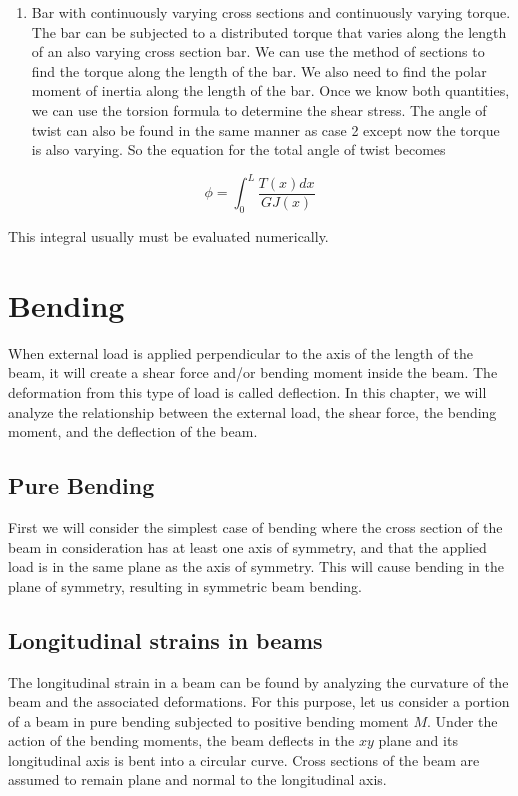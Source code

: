 \documentclass[a4paper,openany,12pt]{book}
\begin{document}
\begin{enumerate}
\item Bar with continuously varying cross sections and continuously varying
torque. The bar can be subjected to a distributed torque that varies
along the length of an also varying cross section bar. We can use the
method of sections to find the torque along the length of the bar. We
also need to find the polar moment of inertia along the length of the
bar. Once we know both quantities, we can use the torsion formula to
determine the shear stress. The angle of twist can also be found in
the same manner as case 2 except now the torque is also varying. So
the equation for the total angle of twist becomes
\end{enumerate}


$$\phi  = \int_0^L \frac{T(x)dx}{GJ(x)}$$

This integral usually must be evaluated numerically.

\section{Bending}
\label{section: bending}
When external load is applied perpendicular to the axis of the length of
the beam, it will create a shear force and/or bending moment inside the
beam. The deformation from this type of load is called deflection. In
this chapter, we will analyze the relationship between the external
load, the shear force, the bending moment, and the deflection of the
beam.

\subsection{Pure Bending}
\label{pure-bending}
First we will consider the simplest case of bending where the cross
section of the beam in consideration has at least one axis of symmetry,
and that the applied load is in the same plane as the axis of symmetry.
This will cause bending in the plane of symmetry, resulting in symmetric
beam bending.

\subsection{Longitudinal strains in beams}
\label{longitudinal-strains-in-beams}
The longitudinal strain in a beam can be found by analyzing the
curvature of the beam and the associated deformations. For this purpose,
let us consider a portion of a beam in pure bending subjected to
positive bending moment \(M\). Under the action of the bending moments,
the beam deflects in the \(xy\) plane and its longitudinal axis is bent
into a circular curve. Cross sections of the beam are assumed to remain
plane and normal to the longitudinal axis.
\end{document}
